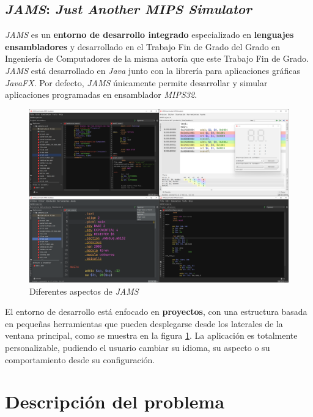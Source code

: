 \subsection{\textit{JAMS}: \textit{Just Another MIPS Simulator}}
\label{subsec:jams-just-another-mips-simulator}

\textit{JAMS}\cite{JAMS} es un \textbf{entorno de desarrollo integrado} especializado
en \textbf{lenguajes ensambladores} y desarrollado en el Trabajo Fin de Grado
del Grado en Ingeniería de Computadores de la misma
autoría que este Trabajo Fin de Grado.
\textit{JAMS} está desarrollado en \textit{Java}\cite{JAVA} junto
con la librería para aplicaciones gráficas \textit{JavaFX}\cite{JAVAFX}.
Por defecto, \textit{JAMS} únicamente permite desarrollar y simular
aplicaciones programadas en ensamblador \textit{MIPS32}.

\begin{figure}[h]
    \centering
    \includegraphics[width=\textwidth]{images/introduction/jams-collage}
    \caption{Diferentes aspectos de \textit{JAMS}}
    \label{fig:jams-collage}
\end{figure}

El entorno de desarrollo está enfocado en \textbf{proyectos},
con una estructura basada en pequeñas herramientas que pueden
desplegarse desde los laterales de la ventana principal, como
se muestra en la figura \ref{fig:jams-collage}.
La aplicación es totalmente personalizable, pudiendo el usuario
cambiar su idioma, su aspecto o su comportamiento desde
su configuración.

\section{Descripción del problema}\label{sec:descripcion-del-problema}

